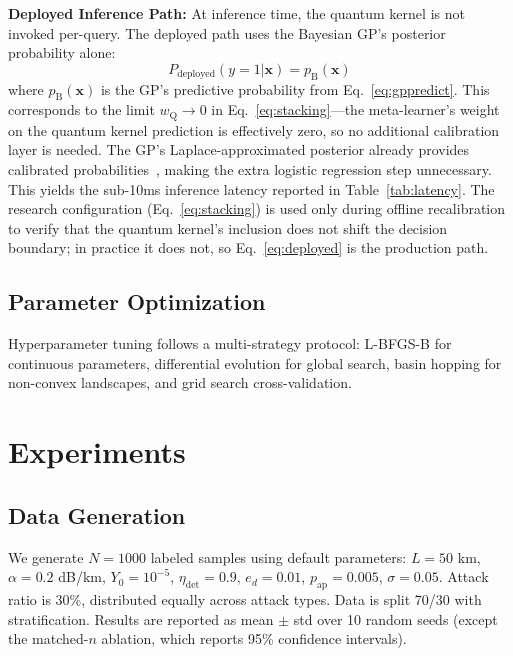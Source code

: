 \documentclass[conference,10pt]{IEEEtran}
\begin{document}
\textbf{Deployed Inference Path:} At inference time, the quantum kernel is not invoked per-query. The deployed path uses the Bayesian GP's posterior probability alone:
\begin{equation}
P_{\text{deployed}}(y = 1 | \mathbf{x}) = p_{\text{B}}(\mathbf{x})
\label{eq:deployed}
\end{equation}
where $p_{\text{B}}(\mathbf{x})$ is the GP's predictive probability from Eq.~\ref{eq:gppredict}. This corresponds to the limit $w_{\text{Q}} \to 0$ in Eq.~\ref{eq:stacking}---the meta-learner's weight on the quantum kernel prediction is effectively zero, so no additional calibration layer is needed. The GP's Laplace-approximated posterior already provides calibrated probabilities~\cite{rasmussen2006gaussian}, making the extra logistic regression step unnecessary. This yields the sub-10ms inference latency reported in Table~\ref{tab:latency}. The research configuration (Eq.~\ref{eq:stacking}) is used only during offline recalibration to verify that the quantum kernel's inclusion does not shift the decision boundary; in practice it does not, so Eq.~\ref{eq:deployed} is the production path.

\subsection{Parameter Optimization}

Hyperparameter tuning follows a multi-strategy protocol: L-BFGS-B for continuous parameters, differential evolution for global search, basin hopping for non-convex landscapes, and grid search cross-validation.

\section{Experiments}
\label{sec:experiments}

\subsection{Data Generation}

We generate $N = 1000$ labeled samples using default parameters: $L = 50$ km, $\alpha = 0.2$ dB/km, $Y_0 = 10^{-5}$, $\eta_{\text{det}} = 0.9$, $e_d = 0.01$, $p_{\text{ap}} = 0.005$, $\sigma = 0.05$. Attack ratio is 30\%, distributed equally across attack types. Data is split 70/30 with stratification. Results are reported as mean $\pm$ std over 10 random seeds (except the matched-$n$ ablation, which reports 95\% confidence intervals).
\end{document}
